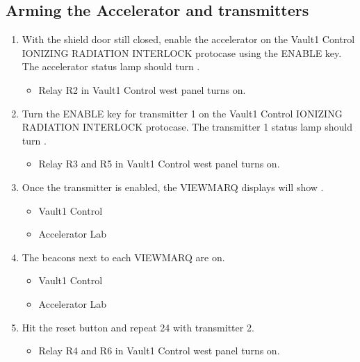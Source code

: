 \documentclass[letterpaper,10pt,english]{sphinxmanual}
\begin{document}
\subsection{Arming the Accelerator and transmitters}
\label{\detokenize{testing_documentation/Vault-1_ionizing_radiation:arming-the-accelerator-and-transmitters}}\begin{enumerate}
%
\item {} 
\sphinxAtStartPar
With the shield door still closed, enable the accelerator on the Vault\sphinxhyphen{}1 Control IONIZING RADIATION INTERLOCK protocase using the ENABLE key.
The accelerator status lamp should turn .
\begin{itemize}
\item {} 
\sphinxAtStartPar
Relay R2 in Vault\sphinxhyphen{}1 Control west panel turns on.

\end{itemize}

\item {} 
\sphinxAtStartPar
Turn the ENABLE key for transmitter 1 on the Vault\sphinxhyphen{}1 Control IONIZING RADIATION INTERLOCK protocase.
The transmitter 1 status lamp should turn .
\begin{itemize}
\item {} 
\sphinxAtStartPar
Relay R3 and R5 in Vault\sphinxhyphen{}1 Control west panel turns on.

\end{itemize}

\item {} 
\sphinxAtStartPar
Once the transmitter is enabled, the VIEWMARQ displays will show .
\begin{itemize}
\item {} 
\sphinxAtStartPar
Vault\sphinxhyphen{}1 Control

\item {} 
\sphinxAtStartPar
Accelerator Lab

\end{itemize}

\item {} 
\sphinxAtStartPar
The  beacons next to each VIEWMARQ are on.
\begin{itemize}
\item {} 
\sphinxAtStartPar
Vault\sphinxhyphen{}1 Control

\item {} 
\sphinxAtStartPar
Accelerator Lab

\end{itemize}

\item {} 
\sphinxAtStartPar
Hit the reset button and repeat 2\sphinxhyphen{}4 with transmitter 2.
\begin{itemize}
\item {} 
\sphinxAtStartPar
Relay R4 and R6 in Vault\sphinxhyphen{}1 Control west panel turns on.

\end{itemize}

\end{enumerate}
\end{document}
